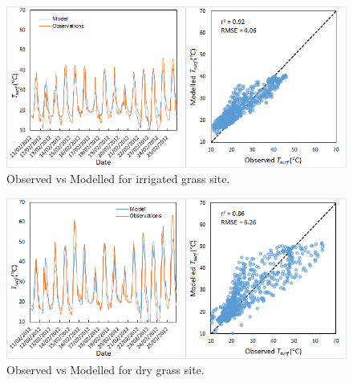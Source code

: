 \documentclass[final,3p,times,authoryear]{elsarticle}
\begin{document}
%
%


\begin{figure}[!htbp]
\includegraphics[trim=0mm 0mm 0mm 0mm, clip,scale=0.5]{images/irrgrassobs.png}
 \caption{Observed vs Modelled  for irrigated grass site.} \label{fig:irrgrassobs}
\end{figure}

 
\begin{figure}[!htbp]
\includegraphics[trim=0mm 0mm 0mm 0mm, clip,scale=0.5]{images/drygrassobs.png}
 \caption{Observed vs Modelled  for dry grass site.} \label{fig:drygrassobs}
\end{figure}
\end{document}
